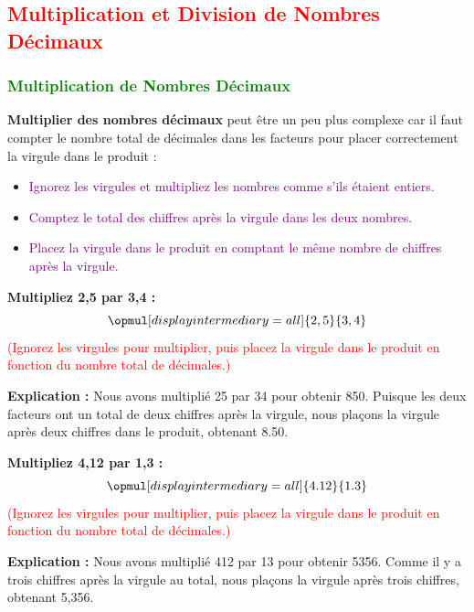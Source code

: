 \documentclass{article}
\begin{document}
\subsection{\textcolor{red}{Multiplication et Division de Nombres Décimaux}}

\subsubsection{\textcolor{green}{Multiplication de Nombres Décimaux}}

\vspace{0.25cm} 

\textbf{Multiplier des nombres décimaux} peut être un peu plus complexe car il faut compter le nombre total de décimales dans les facteurs pour placer correctement la virgule dans le produit :

    \begin{itemize}
        \item \textcolor{purple}{Ignorez les virgules et multipliez les nombres comme s'ils étaient entiers.}
        \item \textcolor{purple}{Comptez le total des chiffres après la virgule dans les deux nombres.}
        \item \textcolor{purple}{Placez la virgule dans le produit en comptant le même nombre de chiffres après la virgule.}
    \end{itemize}

\vspace{0.2cm}

\begin{tcolorbox}[colback=orange!10!white, colframe=orange!75!black, sharp corners=south, boxrule=0.8mm, title=Exemple de Multiplication]
    \textbf{Multipliez 2,5 par 3,4 :}
    \[
    \opmul[displayintermediary=all]{2,5}{3,4}
    \]
    \textcolor{red}{(Ignorez les virgules pour multiplier, puis placez la virgule dans le produit en fonction du nombre total de décimales.)}
    
    \textbf{Explication :} Nous avons multiplié 25 par 34 pour obtenir 850. Puisque les deux facteurs ont un total de deux chiffres après la virgule, nous plaçons la virgule après deux chiffres dans le produit, obtenant 8.50.
\end{tcolorbox}

\begin{tcolorbox}[colback=orange!10!white, colframe=orange!75!black, sharp corners=south, boxrule=0.8mm, title=Exemple de Multiplication]
    \textbf{Multipliez 4,12 par 1,3 :}
    \[
    \opmul[displayintermediary=all]{4.12}{1.3}
    \]
    \textcolor{red}{(Ignorez les virgules pour multiplier, puis placez la virgule dans le produit en fonction du nombre total de décimales.)}
    
    \textbf{Explication :} Nous avons multiplié 412 par 13 pour obtenir 5356. Comme il y a trois chiffres après la virgule au total, nous plaçons la virgule après trois chiffres, obtenant 5,356.
\end{tcolorbox}
\end{document}
